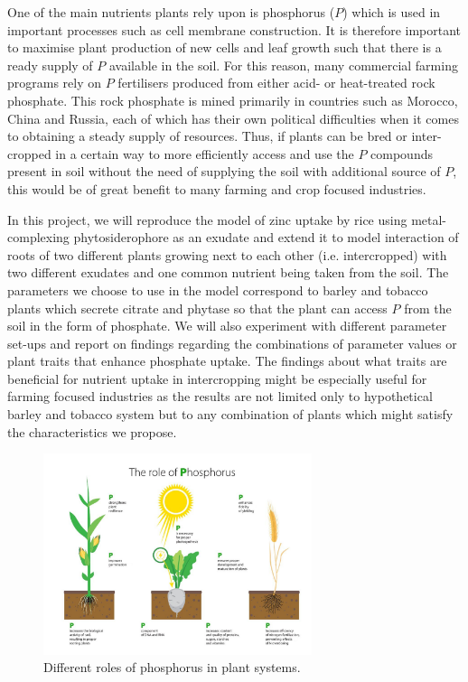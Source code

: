 \documentclass[11pt]{article}
\begin{document}
One of the main nutrients plants rely upon is phosphorus ($P$) which is used in important processes such as cell membrane construction. It is therefore important to maximise plant production of new cells and leaf growth such that there is a ready supply of $P$ available in the soil. For this reason, many commercial farming programs rely on $P$ fertilisers produced from either acid- or heat-treated rock phosphate. This rock phosphate is mined primarily in countries such as Morocco, China and Russia, each of which has their own political difficulties when it comes to obtaining a steady supply of resources. Thus, if plants can be bred or inter-cropped in a certain way to more efficiently access and use the $P$ compounds present in soil without the need of supplying the soil with additional source of $P$, this would be of great benefit to many farming and crop focused industries.

In this project, we will reproduce the model of zinc uptake by rice using metal-complexing phytoside\-rophore as an exudate \cite{Ptashnyk-2011} and extend it to model interaction of roots of two different plants growing next to each other (i.e. intercropped) with two different exudates and one common nutrient being taken from the soil. The parameters we choose to use in the model correspond to barley and tobacco plants which secrete citrate and phytase so that the plant can access $P$ from the soil in the form of phosphate. We will also experiment with different parameter set-ups and report on findings regarding the combinations of parameter values or plant traits that enhance phosphate uptake. The findings about what traits are beneficial for nutrient uptake in intercropping might be especially useful for farming focused industries as the results are not limited only to hypothetical barley and tobacco system but to any combination of plants which might satisfy the characteristics we propose. 

\begin{figure}[!htb]
  \vspace{-1cm}
     \centering
     \includegraphics[width=0.7\textwidth]{Phosphorus-plant-roles.jpg}
     \caption{Different roles of phosphorus in plant systems.}
     \label{fig:Phos}
 \end{figure}
 
\end{document}

